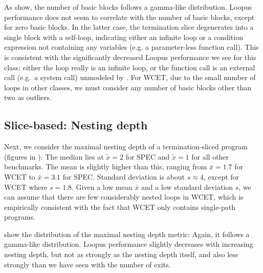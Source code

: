     As  show, the number of basic blocks follows a gamma-like distribution. Loopus performance does not seem to correlate with the number of basic blocks, except for zero basic blocks. In the latter case, the termination slice degenerates into a single block with a self-loop, indicating either an infinite loop or a condition expression not containing any variables (e.g. a parameter-less function call). This is consistent with the significantly decreased Loopus performance we see for this class: either the loop really is an infinite loop, or the function call is an external call (e.g.\ a system call) unmodeled by \loopus{}. For WCET, due to the small number of loops in other classes, we must consider any number of basic blocks other than two as outliers.



    \def \plotcutarrow {->}

\subsection{Slice-based: Nesting depth}

Next, we consider the maximal nesting depth of a termination-sliced program (figures in ): The median lies at $\tilde{x} = 2$ for SPEC and $\tilde{x} = 1$ for all other benchmarks. The mean is slightly higher than this, ranging from $\bar{x} = 1.7$ for WCET to $\bar{x} = 3.1$ for SPEC. Standard deviation is about $s \approx 4$, except for WCET where $s = 1.8$. Given a low mean $\bar{x}$ and a low standard deviation $s$, we can assume that there are few considerably nested loops in WCET, which is empirically consistent with the fact that WCET only contains single-path programs.

     show the distribution of the maximal nesting depth metric: Again, it follows a gamma-like distribution. Loopus performance slightly decreases with increasing nesting depth, but not as strongly as the nesting depth itself, and also less strongly than we have seen with the number of exits.

